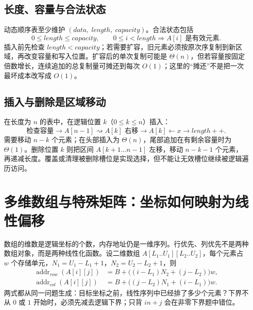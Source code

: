 \documentclass[UTF8,fontset=none,11pt,a4paper]{ctexart}
\begin{document}
\subsection{长度、容量与合法状态}
动态顺序表至少维护 $(data,\;length,\;capacity)$。合法状态包括
\[
0\le length\le capacity,\qquad 0\le i<length\Rightarrow A[i]\text{ 是有效元素}.
\]
插入前先检查 $length<capacity$；若需要扩容，旧元素必须按原次序复制到新区域，再改变容量和写入位置。扩容后的单次复制可能是 $\Theta(n)$，但若容量按固定倍数增长，连续追加的总复制量可摊还到每次 $O(1)$；这里的“摊还”不是把一次最坏成本改写成 $O(1)$。

\subsection{插入与删除是区域移动}
在长度为 $n$ 的表中，在逻辑位置 $k$（$0\le k\le n$）插入：
\[
\text{检查容量}\to A[n-1]\rightsquigarrow A[k]\text{ 右移}\to A[k]\leftarrow x\to length{+}{+}.
\]
需要移动 $n-k$ 个元素；在头部插入为 $\Theta(n)$，尾部追加在有剩余容量时为 $\Theta(1)$。删除位置 $k$ 则把区间 $A[k+1\ldots n-1]$ 左移，移动 $n-k-1$ 个元素，再递减长度。覆盖或清理被删除槽位是实现选择，但不能让无效槽位继续被逻辑遍历访问。

\begin{center}
\end{center}

\section{多维数组与特殊矩阵：坐标如何映射为线性偏移}
数组的维数是逻辑坐标的个数，内存地址仍是一维序列。行优先、列优先不是两种数组对象，而是两种线性化函数。设二维数组 $A[L_1..U_1][L_2..U_2]$，每个元素占 $w$ 个存储单元，$N_1=U_1-L_1+1$，$N_2=U_2-L_2+1$，则
\[
\begin{aligned}
\operatorname{addr}_{row}(A[i][j])&=B+\bigl((i-L_1)N_2+(j-L_2)\bigr)w,\\
\operatorname{addr}_{col}(A[i][j])&=B+\bigl((j-L_2)N_1+(i-L_1)\bigr)w.
\end{aligned}
\]
两式都从同一问题生成：目标坐标之前，线性序列中已经排了多少个元素？下界不从 $0$ 或 $1$ 开始时，必须先减去逻辑下界；只背 $i n+j$ 会在非零下界题中错位。
\end{document}
